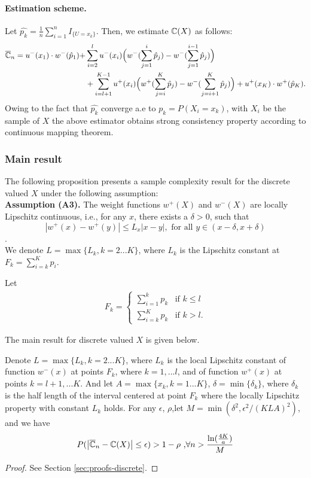 \paragraph{Estimation scheme.} 
Let $\hat{p_k}= \frac{1}{n} \sum_{i=1}^n I_{\{U =x_k\}}$. Then, we estimate $\mathbb{C}(X)$ as follows:
\begin{align}
 \label{eq:cpt-discrete-est}
\overline {\mathbb{C}}_n = 
u^-(x_1)\cdot w^-(\hat p_1)+
& \sum_{i=2}^l u^-(x_i) \Big(w^-(\sum_{j=1}^i \hat p_j) - w^-(\sum_{j=1}^{i-1} \hat p_j)\Big) 
\\
&
+ \sum_{i=l+1}^{K-1} u^+(x_i) \Big(w^+(\sum_{j=i}^K \hat p_j) - w^-(\sum_{j=i+1}^K \hat p_j) \Big)+ u^+(x_K)\cdot w^+(\hat p_K).
\end{align}
Owing to the fact that $\hat{p_k}$ converge a.e to $p_k=P(X_i=x_k)$, with $X_i$ be the sample of $X$ the above estimator obtains strong consistency property according to continuous mapping theorem. 


\subsubsection*{Main result}
The following proposition presents a sample complexity result for the discrete valued $X$ under the following assumption:\\
\textbf{Assumption (A3).}  The weight functions $w^+(X)$ and $w^-(X)$ are locally Lipschitz continuous, i.e., for any $x$, there exists a $\delta>0$, such that
$$| w^+(x) - w^+(y) | \leq L_x |x-y|, \text{ for all } y \in (x-\delta,x+\delta) $$.\\

We denote $L=\max\{L_k, k=2...K\}$,  where $L_k$ is the Lipschitz constant at $F_k = \sum_{i=k}^K p_i$.


Let 
\begin{align}
\label{eq:Fk}
F_k = 
\begin{cases}
   \sum_{i=1}^k p_k & \text{if   } k \leq l \\
   \sum_{i=k}^K p_k & \text{if  }  k > l.
\end{cases}  
\end{align}

The main result for discrete valued $X$ is given below.
\begin{proposition}
\label{prop:sample-complexity-discrete}
Denote $L=\max\{L_k, k=2...K\} $, where $L_k$ is the local Lipschitz constant of function $w^-(x)$ at points
$F_k$, where $k=1,...l$, and of function $w^+(x)$ at points $k=l+1,...K$. 
And let $A=\max\{x_k, k=1...K\}$, $\delta =\min\{\delta_k\}$, where $\delta_k$ is the half length of the interval centered at point $F_k$ where the locally Lipschitz property with constant $L_k$ holds.
For any $\epsilon$, $\rho$,let $M=\min(\delta^2, \epsilon^2/(KLA)^2)$, and we have 
\begin{align}
P(\left|
\overline {\mathbb{C}}_n -\mathbb{C}(X)
\right| \leq \epsilon) > 1-\rho \text{        ,} \forall n> \frac{\ln(\frac{4K}{a})} { M} 
\end{align}
\end{proposition}
\begin{proof}
 See Section \ref{sec:proofs-discrete}.
\end{proof}

